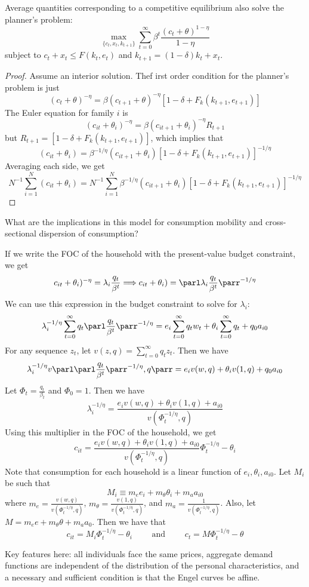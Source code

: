 \documentclass[10pt]{article}
\begin{document}
\begin{model}
	\begin{proposition}
		Average quantities corresponding to a competitive equilibrium also solve the planner's problem: \[\max_{\{c_t,x_t,k_{t+1}\}} \sum_{t=0}^\infty \beta^t \frac{(c_t + \theta)^{1-\eta}}{1-\eta}\]subject to $c_t + x_t \le F(k_t,e_t)$ and $k_{t+1} = (1-\delta)k_t + x_t$.
	\end{proposition}
	\begin{proof}
		Assume an interior solution. Thef irst order condition for the planner's problem is just \[(c_t + \theta)^{-\eta} = \beta(c_{t+1} + \theta)^{-\eta}[1-\delta + F_k(k_{t+1},e_{t+1})]\]The Euler equation for family $i$ is \[(c_{it} + \theta_i)^{-\eta}= \beta(c_{it+1} + \theta_i)^{-\eta} R_{t+1}\]but $R_{t+1} = [1-\delta + F_k(k_{t+1},e_{t+1})]$, which implies that \[(c_{it} + \theta_i)= \beta^{-1/\eta}(c_{it+1} + \theta_i) [1-\delta + F_k(k_{t+1},e_{t+1})]^{-1/\eta}\]Averaging each side, we get\[N^{-1} \sum_{i=1}^N (c_{it} + \theta_i)= N^{-1}\sum_{i=1}^N \beta^{-1/\eta}(c_{it+1} + \theta_i) [1-\delta + F_k(k_{t+1},e_{t+1})]^{-1/\eta}\]
	\end{proof}
	
	\begin{question}
		What are the implications in this model for consumption mobility and cross-sectional dispersion of consumption?
	\end{question}
	If we write the FOC of the household with the present-value budget constraint, we get \[c_{it} + \theta_i)^{-\eta} = \lambda_i \frac{q_t}{\beta^t} \Longrightarrow c_{it} + \theta_i) = \parl \lambda_i \frac{q_t}{\beta^t}\parr^{-1/\eta}\]We can use this expression in the budget constraint to solve for $\lambda_i$:
	\[
	\lambda_i^{-1/\eta} \sum_{t=0}^\infty q_t \parl \frac{q_t}{\beta^t}\parr^{-1/\eta} = e_i \sum_{t=0}^\infty q_tw_t + \theta_i \sum_{t=0}^\infty q_t + q_0 a_{i0}
	\]
	For any sequence $z_t$, let $v(z,q) = \sum_{t=0}^\infty q_tz_t$. Then we have \[\lambda_i^{-1/\eta} v\parl \parl \frac{q_t}{\beta^t}\parr^{-1/\eta},q\parr = e_iv(w,q) + \theta_iv(1,q) + q_0a_{i0}\]Let $\Phi_t = \frac{q_t}{\beta_t}$ and $\Phi_0 = 1$. Then we have \[\lambda_i^{-1/\eta} = \frac{e_iv(w,q) + \theta_iv(1,q) + a_{i0}}{v(\Phi_t^{-1/\eta},q)}\]Using this multiplier in the FOC of the household, we get \[c_{it} = \frac{e_iv(w,q) + \theta_iv(1,q) + a_{i0}}{v(\Phi_t^{-1/\eta},q)}\Phi_t^{-1/\eta}- \theta_i\]Note that consumption for each household is a linear function of $e_i,\theta_i,a_{i0}$. Let $M_i$ be such that \[M_i \equiv m_e e_i+m_\theta\theta_i + m_aa_{i0}\]where $m_e = \frac{v(w,q)}{v(\Phi_t^{-1/\eta},q)} $, $m_\theta = \frac{v(1,q)}{v(\Phi_t^{-1/\eta},q)}$, and $m_a = \frac{1}{v(\Phi_t^{-1/\eta},q)}$. Also, let $M = m_e e + m_\theta \theta + m_a a_0$. Then we have that \[c_{it} = M_i \Phi_t^{-1/\eta} -\theta_i \qquad \text{ and } \qquad c_{t} = M \Phi_t^{-1/\eta} -\theta\]
	\begin{remark}
		Key features here: all individuals face the same prices, aggregate demand functions are independent of the distribution of the personal characteristics, and a necessary and sufficient condition is that the Engel curves be affine.
	\end{remark}
	

\end{model}
\end{document}
